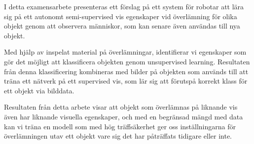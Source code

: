 I detta examensarbete presenteras ett förslag på ett system för robotar att lära sig på ett autonomt semi-supervised vis egenskaper vid överlämning för olika objekt genom att observera människor, som kan senare även användas till nya objekt.

Med hjälp av inspelat material på överlämningar, identifierar vi egenskaper som gör det möjligt att klassificera objekten genom unsupervised learning. Resultaten från denna klassificering kombineras med bilder på objekten som används till att träna ett nätverk på ett supervised vis, som lär sig att förutspå korrekt klass för ett objekt via bilddata.

Resultaten från detta arbete visar att objekt som överlämnas på liknande vis även har liknande visuella egenskaper, och med en begränsad mängd med data kan vi träna en modell som med hög träffsäkerhet ger oss inställningarna för överlämningen utav ett objekt vare sig det har påträffats tidigare eller inte.
